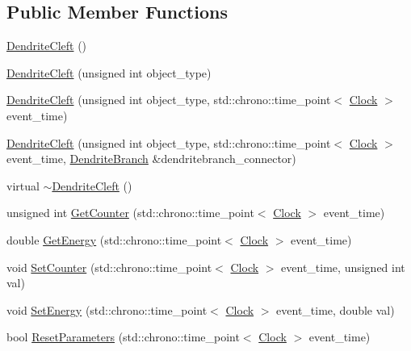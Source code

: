 \subsection*{Public Member Functions}
\begin{DoxyCompactItemize}
\item 
\hyperlink{class_dendrite_cleft_a244a2e6377fafdf79df757d39a2684e5}{Dendrite\+Cleft} ()
\item 
\hyperlink{class_dendrite_cleft_a335660dfc63f55980b2dcf8849568086}{Dendrite\+Cleft} (unsigned int object\+\_\+type)
\item 
\hyperlink{class_dendrite_cleft_ad4070ce743d8302bc120ea948890ea37}{Dendrite\+Cleft} (unsigned int object\+\_\+type, std\+::chrono\+::time\+\_\+point$<$ \hyperlink{universe_8h_a0ef8d951d1ca5ab3cfaf7ab4c7a6fd80}{Clock} $>$ event\+\_\+time)
\item 
\hyperlink{class_dendrite_cleft_abcb81284cd9bd7ee2863eecfb6b59f62}{Dendrite\+Cleft} (unsigned int object\+\_\+type, std\+::chrono\+::time\+\_\+point$<$ \hyperlink{universe_8h_a0ef8d951d1ca5ab3cfaf7ab4c7a6fd80}{Clock} $>$ event\+\_\+time, \hyperlink{class_dendrite_branch}{Dendrite\+Branch} \&dendritebranch\+\_\+connector)
\item 
virtual \hyperlink{class_dendrite_cleft_ad99958c45fa63f2f68b65d7e5ba45b32}{$\sim$\+Dendrite\+Cleft} ()
\item 
unsigned int \hyperlink{class_dendrite_cleft_ac567530d9f083e1ee65d5c6484cc9fa7}{Get\+Counter} (std\+::chrono\+::time\+\_\+point$<$ \hyperlink{universe_8h_a0ef8d951d1ca5ab3cfaf7ab4c7a6fd80}{Clock} $>$ event\+\_\+time)
\item 
double \hyperlink{class_dendrite_cleft_ad673df32db3982b3df745a55bf527834}{Get\+Energy} (std\+::chrono\+::time\+\_\+point$<$ \hyperlink{universe_8h_a0ef8d951d1ca5ab3cfaf7ab4c7a6fd80}{Clock} $>$ event\+\_\+time)
\item 
void \hyperlink{class_dendrite_cleft_a428b8e5117f381a382e0071b936d42a1}{Set\+Counter} (std\+::chrono\+::time\+\_\+point$<$ \hyperlink{universe_8h_a0ef8d951d1ca5ab3cfaf7ab4c7a6fd80}{Clock} $>$ event\+\_\+time, unsigned int val)
\item 
void \hyperlink{class_dendrite_cleft_a7e09ccb70936deabde9c12457cec949c}{Set\+Energy} (std\+::chrono\+::time\+\_\+point$<$ \hyperlink{universe_8h_a0ef8d951d1ca5ab3cfaf7ab4c7a6fd80}{Clock} $>$ event\+\_\+time, double val)
\item 
bool \hyperlink{class_dendrite_cleft_a3fee388d7023cfb460412e0322244ae2}{Reset\+Parameters} (std\+::chrono\+::time\+\_\+point$<$ \hyperlink{universe_8h_a0ef8d951d1ca5ab3cfaf7ab4c7a6fd80}{Clock} $>$ event\+\_\+time)

\end{DoxyCompactItemize}
